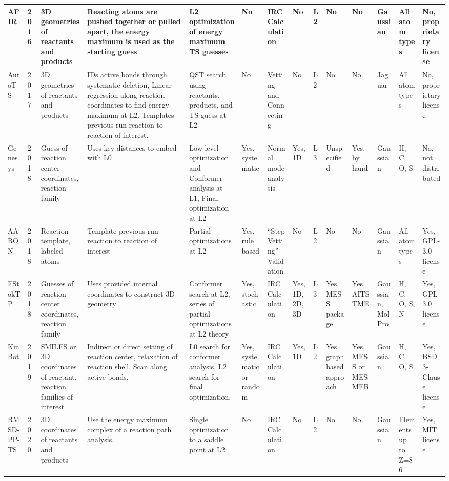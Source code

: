 \documentclass[preprint, 11pt]{elsarticle} %
\begin{document}
\begin{landscape}
\begin{singlespace}
\begin{footnotesize}
\begin{longtable}{| p{0.5in} | p{0.25in} | p{0.6in} | p{1.0in} | p{0.6in}| p{0.45in}| p{0.5in }| p{0.3in}| p{0.2in}| p{0.5in}| p{0.45in}| p{0.5in}| p{0.5in} | p{0.45in} |}
\hline
AFIR & 2016 &  3D geometries of reactants and products  & Reacting atoms are pushed together or pulled apart, the energy maximum is used as the starting guess & L2 optimization of energy maximum TS guesses & No &  IRC Calculation  & No & L2 & No & No & Gaussian & All atom types &  No, proprietary license  \\ 
\hline
AutoTS   & 2017 &  3D geometries of reactants and products  &  IDs active bonds through systematic deletion, Linear regression along reaction coordinates to find energy maximum at L2. Templates previous run reaction to reaction of interest.  &  QST search using reactants, products, and TS guess at L2  &  No  &  Vetting and Connecting  &  No  & L2 &  No  &  No  &  Jaguar  &  All atom types  &  No, proprietary license  \\ 
\hline
Genesys  & 2018 &  Guess of reaction center coordinates, reaction family  &  Uses key distances to embed with L0  &  Low level optimization and Conformer analysis at L1, Final optimization at L2  &  Yes, systematic  &  Normal mode analysis  &  Yes, 1D  & L3  &  Unspecified  &  Yes, by hand  &  Gaussian &  H, C, O, S  &  No, not distributed  \\ 
\hline
AARON    & 2018 &  Reaction template, labeled atoms  &  Template previous run reaction to reaction of interest  &  Partial optimizations at L2  &  Yes, rule based  &  ``Step Vetting'' Validation  &  No  & L2 &  No  &  No  &  Gaussian  &  All atom types  &  Yes, GPL-3.0 license  \\ 
\hline
EStokTP  & 2018 &  Guesses of reaction center coordinates, reaction family  &  Uses provided internal coordinates to construct 3D geometry  &  Conformer search at L2, series of partial optimizations at L2 theory  &  Yes, stochastic  &  IRC Calculation  & Yes, 1D, 2D, 3D  & L3  &  Yes, MESS package  &  Yes, AITSTME  &  Gaussian, MolPro  &  H, C, O, S, N  &  Yes, GPL-3.0 license   \\ 
\hline
KinBot   & 2019 &  SMILES or 3D coordinates of reactant, reaction families of interest  &  Indirect or direct setting of reaction center, relaxation of reaction shell. Scan along active bonds.   &  L0 search for conformer analysis, L2 search for final optimization.  &  Yes, systematic or random  &  IRC Calculation  &  Yes, 1D  & L2 &  Yes, graph based approach  &  Yes, MESS or MESMER  &  Gaussian  &  H, C, O, S  &  Yes, BSD 3-Clause license  \\ 
\hline
RMSD-PP-TS & 2020 & 3D coordinates of reactants and products & Use the energy maximum complex of a reaction path analysis. & Single optimization to a saddle point at L2 & No & IRC Calculation & No & L2 & No & No & Gaussian & Elements up to Z=86 & Yes, MIT license 

\end{longtable}
\end{footnotesize}
\end{singlespace}
\end{landscape}
\end{document}

